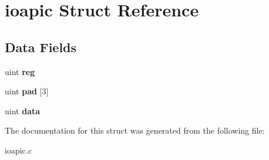 \hypertarget{structioapic}{}\section{ioapic Struct Reference}
\label{structioapic}
\subsection*{Data Fields}
\begin{DoxyCompactItemize}
\item 
\mbox{\label{structioapic_a84bff406f77801bd1574b9cfb8c23ecf}} 
uint {\bfseries reg}
\item 
\mbox{\label{structioapic_a28ee224d088b53995504eae8cc8fd6ba}} 
uint {\bfseries pad} \mbox{[}3\mbox{]}
\item 
\mbox{\label{structioapic_a0612c6bb75dc56f0c4c91ad214a02b3a}} 
uint {\bfseries data}
\end{DoxyCompactItemize}


The documentation for this struct was generated from the following file\+:\begin{DoxyCompactItemize}
\item 
ioapic.\+c\end{DoxyCompactItemize}
